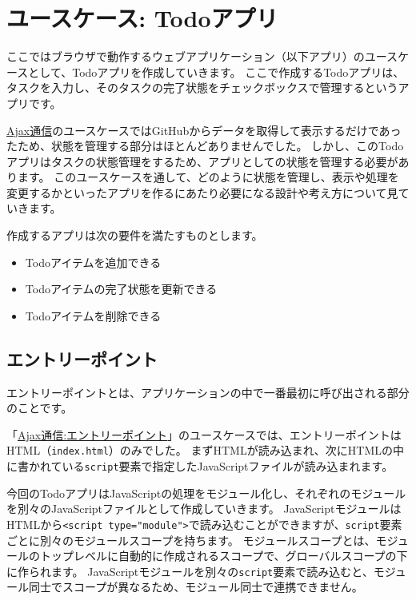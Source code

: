 \hypertarget{todo-app}{%
\chapter{ユースケース: Todoアプリ}\label{todo-app}}

ここではブラウザで動作するウェブアプリケーション（以下アプリ）のユースケースとして、Todoアプリを作成していきます。
ここで作成するTodoアプリは、タスクを入力し、そのタスクの完了状態をチェックボックスで管理するというアプリです。

\href{../ajaxapp/README.md}{Ajax通信}のユースケースではGitHubからデータを取得して表示するだけであったため、状態を管理する部分はほとんどありませんでした。
しかし、このTodoアプリはタスクの状態管理をするため、アプリとしての状態を管理する必要があります。
このユースケースを通して、どのように状態を管理し、表示や処理を変更するかといったアプリを作るにあたり必要になる設計や考え方について見ていきます。

作成するアプリは次の要件を満たすものとします。

\begin{itemize}
\item
  Todoアイテムを追加できる
\item
  Todoアイテムの完了状態を更新できる
\item
  Todoアイテムを削除できる
\end{itemize}

\hypertarget{entrypoint}{%
\section{エントリーポイント}\label{entrypoint}}

エントリーポイントとは、アプリケーションの中で一番最初に呼び出される部分のことです。

「\href{../../ajaxapp/entrypoint/README.md}{Ajax通信:エントリーポイント}」のユースケースでは、エントリーポイントはHTML（\texttt{index.html}）のみでした。
まずHTMLが読み込まれ、次にHTMLの中に書かれている\texttt{script}要素で指定したJavaScriptファイルが読み込まれます。

今回のTodoアプリはJavaScriptの処理をモジュール化し、それぞれのモジュールを別々のJavaScriptファイルとして作成していきます。
JavaScriptモジュールはHTMLから\texttt{<script type="module">}で読み込むことができますが、\texttt{script}要素ごとに別々のモジュールスコープを持ちます。
モジュールスコープとは、モジュールのトップレベルに自動的に作成されるスコープで、グローバルスコープの下に作られます。
JavaScriptモジュールを別々の\texttt{script}要素で読み込むと、モジュール同士でスコープが異なるため、モジュール同士で連携できません。

